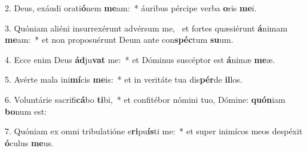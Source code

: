 2. Deus, exáudi orati\textbf{ó}nem \textbf{me}am:~*  áuribus pércipe verba \textbf{o}ris \textbf{me}i.\

3. Quóniam aliéni insurrexérunt advérsum me, \dag\  et fortes quæsiérunt \textbf{á}nimam \textbf{me}am:~*  et non proposuérunt Deum ante con\textbf{spéc}tum \textbf{su}um.\

4. Ecce enim Deus \textbf{ád}ju\textbf{vat} me:~*  et Dóminus suscéptor est \textbf{á}nimæ \textbf{me}æ.\

5. Avérte mala ini\textbf{mí}cis \textbf{me}is:~*  et in veritáte tua dis\textbf{pér}de \textbf{il}los.\

6. Voluntárie sacrifi\textbf{cá}bo \textbf{ti}bi,~*  et confitébor nómini tuo, Dómine: \textbf{quón}iam \textbf{bo}num est:\

7. Quóniam ex omni tribulatióne e\textbf{ri}pu\textbf{ís}ti me:~*  et super inimícos meos despéxit \textbf{ó}culus \textbf{me}us.\

